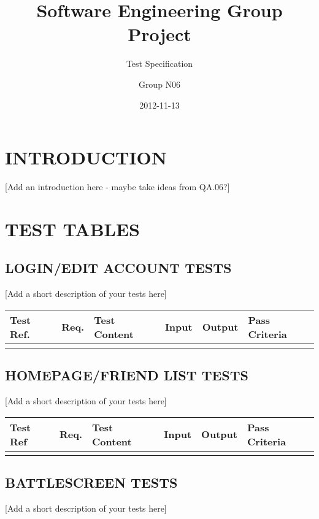 \documentclass{project}
\begin{document}
\title{Software Engineering Group Project}
\subtitle{Test Specification}
\author{Group N06}
\date{2012-11-13}
\maketitle
\tableofcontents
\newpage


\section*{INTRODUCTION}
[Add an introduction here - maybe take ideas from QA.06?]

\clearpage
{}
\section*{TEST TABLES}

\subsection*{LOGIN/EDIT ACCOUNT TESTS}
[Add a short description of your tests here]

\begin{tabular}{| p{2cm} | p{1cm} | p{2cm} | p{3cm} | p{3cm} | p{3cm} |}
\hline
Test Ref. & Req. & Test Content & Input & Output & Pass Criteria \\
\hline
 &  &  &  &  &  \\
\hline
\end{tabular}

\subsection*{HOMEPAGE/FRIEND LIST TESTS}
[Add a short description of your tests here]

\begin{tabular}{| p{2cm} | p{1cm} | p{2cm} | p{3cm} | p{3cm} | p{3cm} |}
\hline
Test Ref & Req. & Test Content & Input & Output & Pass Criteria \\
\hline
 &  &  &  &  &  \\
\hline
\end{tabular}

\subsection*{BATTLESCREEN TESTS}
[Add a short description of your tests here]
\end{document}
